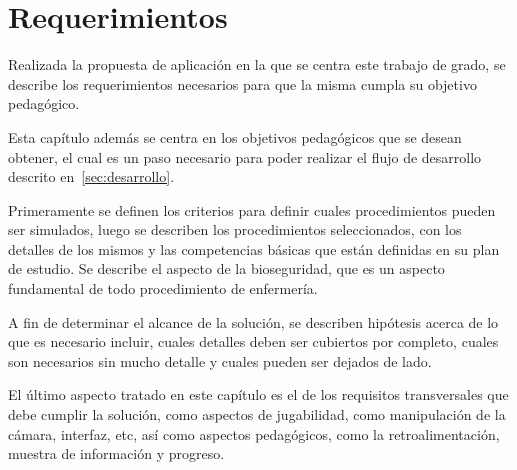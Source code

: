 \chapter{Requerimientos}
\label{chap:requerimientos}


Realizada la propuesta de aplicación en la que se centra este trabajo de grado,
se describe los requerimientos necesarios para que la misma cumpla su objetivo
pedagógico.

Esta capítulo además se centra en los objetivos pedagógicos que se desean
obtener, el cual es un paso necesario para poder realizar el flujo de desarrollo
descrito en~\ref{sec:desarrollo}.

Primeramente se definen los criterios para definir cuales procedimientos pueden
ser simulados, luego se describen los procedimientos seleccionados, con los
detalles de los mismos y las competencias básicas que están definidas en su plan
de estudio. Se describe el aspecto de la bioseguridad, que es un aspecto
fundamental de todo procedimiento de enfermería.

A fin de determinar el alcance de la solución, se describen hipótesis acerca de
lo que es necesario incluir, cuales detalles deben ser cubiertos por completo,
cuales son necesarios sin mucho detalle y cuales pueden ser dejados de lado. 

El último aspecto tratado en este capítulo es el de los requisitos transversales
que debe cumplir la solución, como aspectos de jugabilidad, como manipulación de
la cámara, interfaz, etc, así como aspectos pedagógicos, como la
retroalimentación, muestra de información y progreso.





